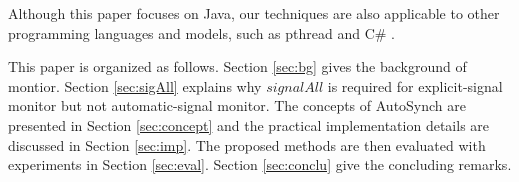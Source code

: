 \documentclass[preprint]{sigplanconf}
\begin{document}


Although this paper 
focuses on Java, our techniques are also applicable to other programming 
languages and models, such as pthread and C\# \cite{hwg03}.


This paper is organized as follows. Section \ref{sec:bg} gives the background
of montior. 
Section \ref{sec:sigAll} explains why $signalAll$ is required for
explicit-signal monitor but not automatic-signal monitor. The concepts of 
AutoSynch are presented in Section \ref{sec:concept} and the practical 
implementation details are discussed in Section  \ref{sec:imp}. The proposed 
methods are then evaluated with experiments in Section \ref{sec:eval}.  
Section \ref{sec:conclu} give the concluding remarks.
\end{document}
